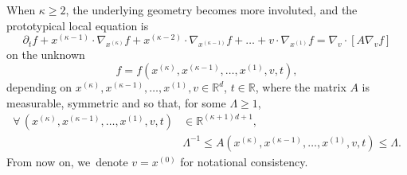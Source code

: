 \documentclass[10pt,a4paper]{amsart}
\theoremstyle{definition}
\newcommand\R{{\mathbb R}}
\begin{document}
When $\kappa \ge 2$, the underlying geometry becomes more involuted, and
the prototypical local equation is
\begin{equation}
\label{eq:kolmo-k}
\partial_t f + x^{(\kappa-1)} \cdot \nabla_{x^{(\kappa)}} f
+ x^{(\kappa-2)} \cdot \nabla_{x^{(\kappa-1)}} f +
\dots + v \cdot \nabla_{x^{(1)}} f =
\nabla_v \cdot \left[ A \nabla_v f \right]
\end{equation}
on the unknown
\[
f=f(x^{(\kappa)},x^{(\kappa-1)}, \dots, x^{(1)},v,t),
\]
depending
on $x^{(\kappa)},x^{(\kappa-1)}, \dots, x^{(1)},v \in \R^d$,
$t \in \R$, where the matrix $A$ is measurable, symmetric and so
that, for some $\Lambda \ge 1$,
\begin{equation} \label{eq:ellip-k}
\begin{aligned}
\forall \, (x^{(\kappa)},x^{(\kappa-1)}, \dots, x^{(1)},v,t)
& \in \R^{(\kappa+1)d+1}, \\
&\Lambda^{-1} \le
A(x^{(\kappa)},x^{(\kappa-1)},\dots,x^{(1)},v,t) \le \Lambda.
\end{aligned}
\end{equation}
From now on, we~denote $v = x^{(0)}$ for notational consistency.
\end{document}
